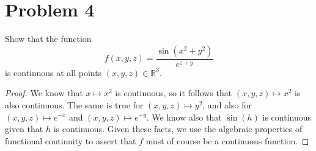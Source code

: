 \documentclass{article}
\theoremstyle{definition}
\begin{document}
\section*{Problem 4}
    \begin{mdframed}
        Show that the function 
        \[
            f(x,y,z) = \frac{\sin(x^2 + y^2)}{e^{z+y}}
        \]
        is continuous at all points $(x,y,z)\in\mathbb{R}^3$.
    \end{mdframed}
    \begin{proof}
        We know that $x \mapsto x^2$ is continuous, so it follows that $(x,y,z)\mapsto x^2$ is also continuous.
        The same is true for $(x,y,z) \mapsto y^2$, and also for $(x,y,z) \mapsto e^{-x}$ and $(x,y,z) \mapsto e^{-y}$.
        We know also that $\sin(h)$ is continuous given that $h$ is continuous. Given these facts, we use the algebraic properties of functional 
        continuity to assert that $f$ must of course be a continuous function.
    \end{proof}
\end{document}
